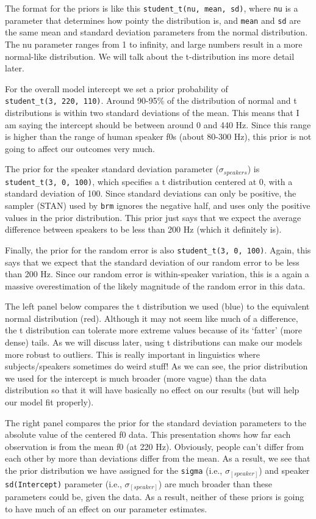 \documentclass[
]{book}
\begin{document}
The format for the priors is like this \texttt{student\_t(nu,\ mean,\ sd)}, where \texttt{nu} is a parameter that determines how pointy the distribution is, and \texttt{mean} and \texttt{sd} are the same mean and standard deviation parameters from the normal distribution. The nu parameter ranges from 1 to infinity, and large numbers result in a more normal-like distribution. We will talk about the t-distribution ins more detail later.

For the overall model intercept we set a prior probability of \texttt{student\_t(3,\ 220,\ 110)}. Around 90-95\% of the distribution of normal and t distributions is within two standard deviations of the mean. This means that I am saying the intercept should be between around 0 and 440 Hz. Since this range is higher than the range of human speaker f0s (about 80-300 Hz), this prior is not going to affect our outcomes very much.

The prior for the speaker standard deviation parameter (\(\sigma_{speakers}\)) is \texttt{student\_t(3,\ 0,\ 100)}, which specifies a t distribution centered at 0, with a standard deviation of 100. Since standard deviations can only be positive, the sampler (STAN) used by \texttt{brm} ignores the negative half, and uses only the positive values in the prior distribution. This prior just says that we expect the average difference between speakers to be less than 200 Hz (which it definitely is).

Finally, the prior for the random error is also \texttt{student\_t(3,\ 0,\ 100)}. Again, this says that we expect that the standard deviation of our random error to be less than 200 Hz. Since our random error is within-speaker variation, this is a again a massive overestimation of the likely magnitude of the random error in this data.

The left panel below compares the t distribution we used (blue) to the equivalent normal distribution (red). Although it may not seem like much of a difference, the t distribution can tolerate more extreme values because of its `fatter' (more dense) tails. As we will discuss later, using t distributions can make our models more robust to outliers. This is really important in linguistics where subjects/speakers sometimes do weird stuff! As we can see, the prior distribution we used for the intercept is much broader (more vague) than the data distribution so that it will have basically no effect on our results (but will help our model fit properly).

The right panel compares the prior for the standard deviation parameters to the absolute value of the centered f0 data. This presentation shows how far each observation is from the mean f0 (at 220 Hz). Obviously, people can't differ from each other by more than deviations differ from the mean. As a result, we see that the prior distribution we have assigned for the \texttt{sigma} (i.e., \(\sigma_{[speaker]}\)) and speaker \texttt{sd(Intercept)} parameter (i.e., \(\sigma_{[speaker]}\)) are much broader than these parameters could be, given the data. As a result, neither of these priors is going to have much of an effect on our parameter estimates.
\end{document}
